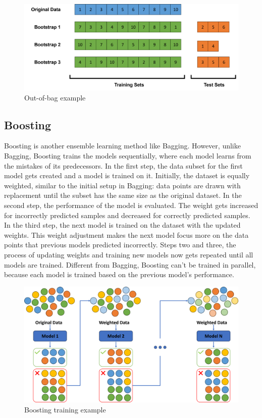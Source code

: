 \begin{figure}[htbp]
    \label{fig:oob}
    \centering
    \includegraphics[width=.8\textwidth]{figures/out_of_bag}
    \caption{Out-of-bag example}
\end{figure}

\subsection{Boosting}
Boosting \citep{Schapire1990} is another ensemble learning method like Bagging.
However, unlike Bagging, Boosting trains the models sequentially, where each
model learns from the mistakes of its predecessors.
In the first step, the data subset for the first model gets created and a model 
is trained on it. Initially, the dataset is equally weighted, similar to the initial
setup in Bagging: data points are drawn with replacement until the subset has the 
same size as the original dataset.
In the second step, the performance of the model is evaluated. The weight gets
increased for incorrectly predicted samples and decreased for correctly predicted
samples. 
In the third step, the next model is trained on the dataset with the updated weights.
This weight adjustment makes the next model focus more on the data points that 
previous models predicted incorrectly.
Steps two and three, the process of updating weights and training new models now gets 
repeated until all models are trained.
Different from Bagging, Boosting can't be trained in parallel, because each model
is trained based on the previous model's performance. 

\begin{figure}[htbp]
    \centering
    \includegraphics[width=.7\textwidth]{figures/boosting_training}
    \caption{Boosting training example}
\end{figure}

